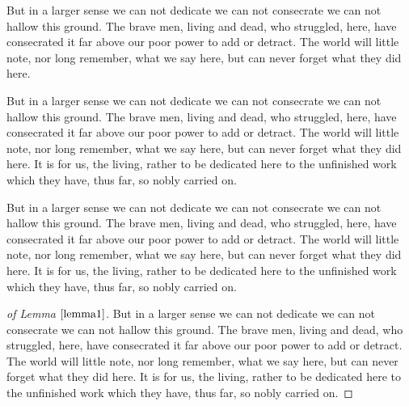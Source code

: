\documentclass{roffin}
\begin{document}
But in a larger sense we can not dedicate we can not consecrate we can not hallow this ground. The brave men, living and dead,
who struggled, here, have consecrated it far above our poor power to add or detract. The world will little note, nor long remember,
what we say here, but can never forget what they did here.

\begin{theorem}
But in a larger sense we can not dedicate we can not consecrate we can not hallow this ground. The brave men, living and dead,
who struggled, here, have consecrated it far above our poor power to add or detract. The world will little note, nor long remember,
what we say here, but can never forget what they did here. It is for us, the living, rather to be dedicated here to the unfinished work
which they have, thus far, so nobly carried on.
\end{theorem}

But in a larger sense we can not dedicate we can not consecrate we can not hallow this ground. The brave men, living and dead,
who struggled, here, have consecrated it far above our poor power to add or detract. The world will little note, nor long remember,
what we say here, but can never forget what they did here. It is for us, the living, rather to be dedicated here to the unfinished work
which they have, thus far, so nobly carried on.
\begin{proof}[of Lemma $\ref{lemma1}$]
But in a larger sense we can not dedicate we can not consecrate we can not hallow this ground. The brave men, living and dead,
who struggled, here, have consecrated it far above our poor power to add or detract. The world will little note, nor long remember,
what we say here, but can never forget what they did here. It is for us, the living, rather to be dedicated here to the unfinished work
which they have, thus far, so nobly carried on.
\end{proof}
\end{document}
